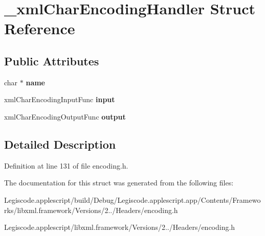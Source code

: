 \hypertarget{struct__xml_char_encoding_handler}{\section{\-\_\-xml\-Char\-Encoding\-Handler Struct Reference}
\label{struct__xml_char_encoding_handler}
}
\subsection*{Public Attributes}
\begin{DoxyCompactItemize}
\item 
\hypertarget{struct__xml_char_encoding_handler_acbf5c1e7606114dadf79ea54a9446850}{char $\ast$ {\bfseries name}}\label{struct__xml_char_encoding_handler_acbf5c1e7606114dadf79ea54a9446850}

\item 
\hypertarget{struct__xml_char_encoding_handler_a83ab9925e70e9cf4570e0606e04ce83d}{xml\-Char\-Encoding\-Input\-Func {\bfseries input}}\label{struct__xml_char_encoding_handler_a83ab9925e70e9cf4570e0606e04ce83d}

\item 
\hypertarget{struct__xml_char_encoding_handler_a0431378526b6f123baa7d15454b7c992}{xml\-Char\-Encoding\-Output\-Func {\bfseries output}}\label{struct__xml_char_encoding_handler_a0431378526b6f123baa7d15454b7c992}

\end{DoxyCompactItemize}


\subsection{Detailed Description}


Definition at line 131 of file encoding.\-h.



The documentation for this struct was generated from the following files\-:\begin{DoxyCompactItemize}
\item 
Legiscode.\-applescript/build/\-Debug/\-Legiscode.\-applescript.\-app/\-Contents/\-Frameworks/libxml.\-framework/\-Versions/2../\-Headers/encoding.\-h\item 
Legiscode.\-applescript/libxml.\-framework/\-Versions/2../\-Headers/encoding.\-h\end{DoxyCompactItemize}
